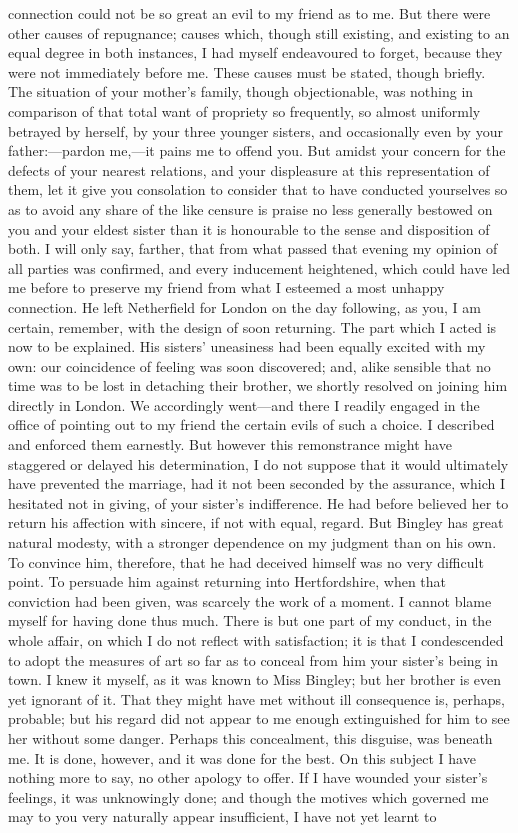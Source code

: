connection could not be so great an evil to my friend as to me. But there were other causes of repugnance; causes which, though still existing, and existing to an equal degree in both instances, I had myself endeavoured to forget, because they were not immediately before me. These causes must be stated, though briefly. The situation of your mother's family, though objectionable, was nothing in comparison of that total want of propriety so frequently, so almost uniformly betrayed by herself, by your three younger sisters, and occasionally even by your father:---pardon me,---it pains me to offend you. But amidst your concern for the defects of your nearest relations, and your displeasure at this representation of them, let it give you consolation to consider that to have conducted yourselves so as to avoid any share of the like censure is praise no less generally bestowed on you and your eldest sister than it is honourable to the sense and disposition of both. I will only say, farther, that from what passed that evening my opinion of all parties was confirmed, and every inducement heightened, which could have led me before to preserve my friend from what I esteemed a most unhappy connection. He left Netherfield for London on the day following, as you, I am certain, remember, with the design of soon returning. The part which I acted is now to be explained. His sisters' uneasiness had been equally excited with my own: our coincidence of feeling was soon discovered; and, alike sensible that no time was to be lost in detaching their brother, we shortly resolved on joining him directly in London. We accordingly went---and there I readily engaged in the office of pointing out to my friend the certain evils of such a choice. I described and enforced them earnestly. But however this remonstrance might have staggered or delayed his determination, I do not suppose that it would ultimately have prevented the marriage, had it not been seconded by the assurance, which I hesitated not in giving, of your sister's indifference. He had before believed her to return his affection with sincere, if not with equal, regard. But Bingley has great natural modesty, with a stronger dependence on my judgment than on his own. To convince him, therefore, that he had deceived himself was no very difficult point. To persuade him against returning into Hertfordshire, when that conviction had been given, was scarcely the work of a moment. I cannot blame myself for having done thus much. There is but one part of my conduct, in the whole affair, on which I do not reflect with satisfaction; it is that I condescended to adopt the measures of art so far as to conceal from him your sister's being in town. I knew it myself, as it was known to Miss Bingley; but her brother is even yet ignorant of it. That they might have met without ill consequence is, perhaps, probable; but his regard did not appear to me enough extinguished for him to see her without some danger. Perhaps this concealment, this disguise, was beneath me. It is done, however, and it was done for the best. On this subject I have nothing more to say, no other apology to offer. If I have wounded your sister's feelings, it was unknowingly done; and though the motives which governed me may to you very naturally appear insufficient, I have not yet learnt to 